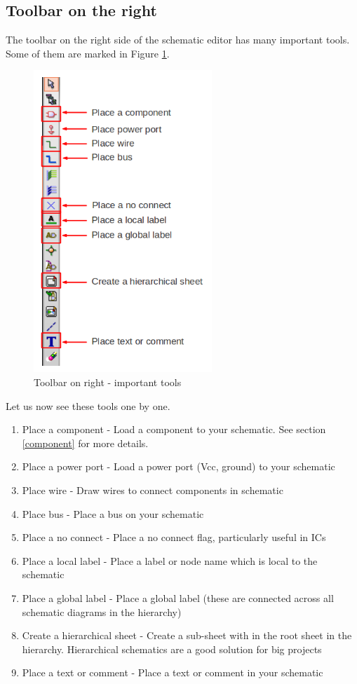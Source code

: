 \subsection{Toolbar on the right}
The toolbar on the right side of the schematic editor has many important tools. Some of them are marked in Figure \ref{eeschem3}.
\begin{figure}
\centering
\includegraphics[width=0.6\textwidth]{figures/eeschema3_mod}
\caption{Toolbar on right - important tools}
\label{eeschem3}
\end{figure}

Let us now see these tools one by one.
\begin{enumerate}
\item Place a component - Load a component to your schematic. See section \ref{component} for more details.
\item Place a power port - Load a power port (Vcc, ground) to your schematic
\item Place wire - Draw wires to connect components in schematic
\item Place bus - Place a bus on your schematic
\item Place a no connect - Place a no connect flag, particularly useful in ICs
\item Place a local label - Place a label or node name which is local to the schematic
\item Place a global label - Place a global label (these are connected across all schematic diagrams in the hierarchy)
\item Create a hierarchical sheet - Create a sub-sheet with in the root sheet in the hierarchy. Hierarchical schematics are a good solution for big projects
\item Place a text or comment - Place a text or comment in your schematic
\end{enumerate}
